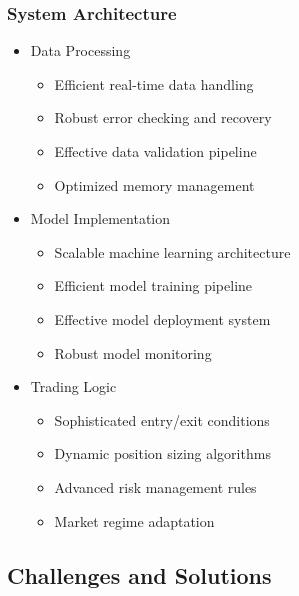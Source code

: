 \documentclass[conference]{IEEEtran}
\begin{document}
\subsubsection{System Architecture}
\begin{itemize}
    \item Data Processing
    \begin{itemize}
        \item Efficient real-time data handling
        \item Robust error checking and recovery
        \item Effective data validation pipeline
        \item Optimized memory management
    \end{itemize}
    
    \item Model Implementation
    \begin{itemize}
        \item Scalable machine learning architecture
        \item Efficient model training pipeline
        \item Effective model deployment system
        \item Robust model monitoring
    \end{itemize}
    
    \item Trading Logic
    \begin{itemize}
        \item Sophisticated entry/exit conditions
        \item Dynamic position sizing algorithms
        \item Advanced risk management rules
        \item Market regime adaptation
    \end{itemize}
\end{itemize}

\subsection{Challenges and Solutions}
\end{document}
